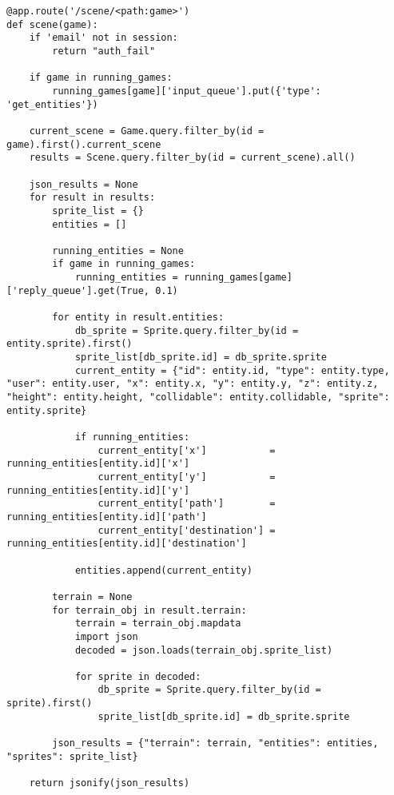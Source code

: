 \noindent
\begin{lstlisting}[style=py, label=scene_route_code]
@app.route('/scene/<path:game>')
def scene(game):
	if 'email' not in session:
		return "auth_fail"

	if game in running_games:
		running_games[game]['input_queue'].put({'type': 'get_entities'})

	current_scene = Game.query.filter_by(id = game).first().current_scene
	results = Scene.query.filter_by(id = current_scene).all()

	json_results = None
	for result in results:
		sprite_list = {}
		entities = []

		running_entities = None
		if game in running_games:
			running_entities = running_games[game]['reply_queue'].get(True, 0.1)

		for entity in result.entities:
			db_sprite = Sprite.query.filter_by(id = entity.sprite).first()
			sprite_list[db_sprite.id] = db_sprite.sprite
			current_entity = {"id": entity.id, "type": entity.type, "user": entity.user, "x": entity.x, "y": entity.y, "z": entity.z, "height": entity.height, "collidable": entity.collidable, "sprite": entity.sprite}

			if running_entities:
				current_entity['x']           = running_entities[entity.id]['x']
				current_entity['y']           = running_entities[entity.id]['y']
				current_entity['path']        = running_entities[entity.id]['path']
				current_entity['destination'] = running_entities[entity.id]['destination']

			entities.append(current_entity)

		terrain = None
		for terrain_obj in result.terrain:
			terrain = terrain_obj.mapdata
			import json
			decoded = json.loads(terrain_obj.sprite_list)

			for sprite in decoded:
				db_sprite = Sprite.query.filter_by(id = sprite).first()
				sprite_list[db_sprite.id] = db_sprite.sprite

		json_results = {"terrain": terrain, "entities": entities, "sprites": sprite_list}

	return jsonify(json_results)
\end{lstlisting}
